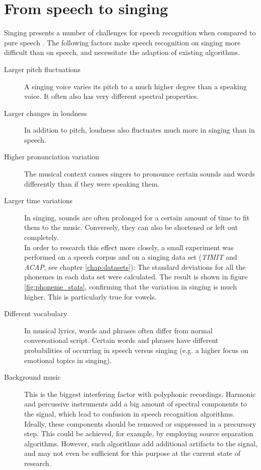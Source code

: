 \section{From speech to singing} \label{sec:sota_speechtosinging}
Singing presents a number of challenges for speech recognition when compared to pure speech \cite{loscos}\cite{goto_alignment}\cite{kruspe_kws1}. The following factors make speech recognition on singing more difficult than on speech, and necessitate the adaption of existing algorithms.
\begin{description}
 \item[Larger pitch fluctuations] A singing voice varies its pitch to a much higher degree than a speaking voice. It often also has very different spectral properties.
 \item[Larger changes in loudness] In addition to pitch, loudness also fluctuates much more in singing than in speech.
 \item[Higher pronunciation variation] The musical context causes singers to pronounce certain sounds and words differently than if they were speaking them.
 \item[Larger time variations] In singing, sounds are often prolonged for a certain amount of time to fit them to the music. Conversely, they can also be shortened or left out completely.\\
 In order to research this effect more closely, a small experiment was performed on a speech corpus and on a singing data set (\textit{TIMIT} and \textit{ACAP}, see chapter \ref{chap:datasets}): The standard deviations for all the phonemes in each data set were calculated. The result is shown in figure \ref{fig:phoneme_stats}, confirming that the variation in singing is much higher. This is particularly true for vowels.
 \item[Different vocabulary] In musical lyrics, words and phrases often differ from normal conversational script. Certain words and phrases have different probabilities of occurring in speech versus singing (e.g. a higher focus on emotional topics in singing).
 \item[Background music] This is the biggest interfering factor with polyphonic recordings. Harmonic and percussive instruments add a big amount of spectral components to the signal, which lead to confusion in speech recognition algorithms. Ideally, these components should be removed or suppressed in a precursory step. This could be achieved, for example, by employing source separation algorithms. However, such algorithms add additional artifacts to the signal, and may not even be sufficient for this purpose at the current state of research.\\

\end{description}
